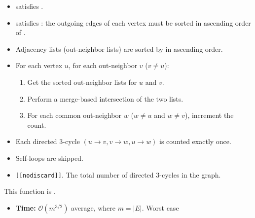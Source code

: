 \begin{itemdescr}
      \pnum\mandates
            \begin{itemize}
                  \item {} satisfies .
                  \item {} satisfies : the outgoing edges of each vertex
                        must be sorted in ascending order of .
            \end{itemize}
      \pnum\preconditions
            \begin{itemize}
                  \item Adjacency lists (out-neighbor lists) are sorted by  in ascending order.
            \end{itemize}
      \pnum\effects
            \begin{itemize}
                  \item For each vertex $u$, for each out-neighbor $v$ ($v \neq u$):
                  \begin{enumerate}
                        \item Get the sorted out-neighbor lists for $u$ and $v$.
                        \item Perform a merge-based intersection of the two lists.
                        \item For each common out-neighbor $w$ ($w \neq u$ and $w \neq v$),
                              increment the count.
                  \end{enumerate}
                  \item Each directed 3-cycle $(u \rightarrow v, v \rightarrow w, u \rightarrow w)$
                        is counted exactly once.
                  \item Self-loops are skipped.
            \end{itemize}
      \pnum\returns 
            \begin{itemize}
                  \item \lstinline{[[nodiscard]]}. The total number of directed 3-cycles in the graph.
            \end{itemize}
      \pnum\throws This function is .
      \pnum\complexity
            \begin{itemize}
                  \item \textbf{Time:} $\mathcal{O}(m^{3/2})$ average, where $m = |E|$. Worst case

\end{itemize}
\end{itemdescr}
